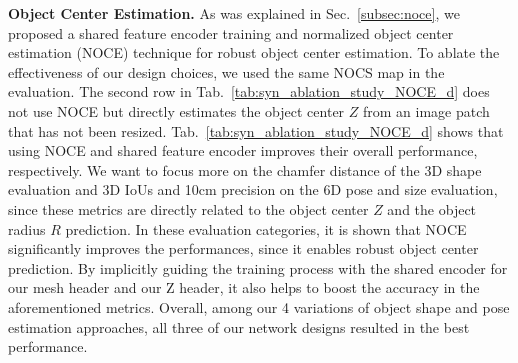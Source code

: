 \documentclass[letterpaper, 10 pt, journal, twoside]{IEEEtran}
\newcommand{\tabref}[1]{Tab.~\ref{#1}}
\newcommand{\secref}[1]{Sec.~\ref{#1}}
\begin{document}
\begin{table*}
\centering
    \caption{\textbf{Quantitative comparison with state-of-the-art methods on the CAMERA25 dataset.}}
    \label{tab:syn_rgbd_sota_compare}
\vspace{-5mm}
\end{table*} 

\noindent{}\textbf{Object Center Estimation.}
As was explained in \secref{subsec:noce}, we proposed a shared feature encoder training and normalized object center estimation (NOCE) technique for robust object center estimation.
To ablate the effectiveness of our design choices, we used the same NOCS map in the evaluation.
The second row in \tabref{tab:syn_ablation_study_NOCE_d} does not use NOCE but directly estimates the object center $Z$ from an image patch that has not been resized.
\tabref{tab:syn_ablation_study_NOCE_d} shows that using NOCE and shared feature encoder improves their overall performance, respectively.
We want to focus more on the chamfer distance of the 3D shape evaluation and 3D IoUs and 10cm precision on the 6D pose and size evaluation, since these metrics are directly related to the object center $Z$ and the object radius $R$ prediction.
In these evaluation categories, it is shown that NOCE significantly improves the performances, since it enables robust object center prediction.
By implicitly guiding the training process with the shared encoder for our mesh header and our Z header, it also helps to boost the accuracy in the aforementioned metrics.
Overall, among our 4 variations of object shape and pose estimation approaches, all three of our network designs resulted in the best performance.
\end{document}
